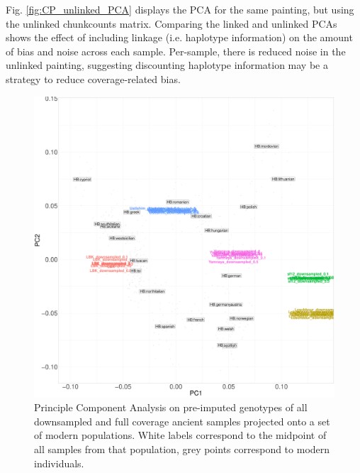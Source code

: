Fig. \ref{fig:CP_unlinked_PCA} displays the PCA for the same painting, but using the unlinked chunkcounts matrix. Comparing the linked and unlinked PCAs shows the effect of including linkage (i.e. haplotype information) on the amount of bias and noise across each sample. Per-sample, there is reduced noise in the unlinked painting, suggesting discounting haplotype information may be a strategy to reduce coverage-related bias.

\begin{figure}[htp]
    \centering
    \includegraphics[width=1.0\textwidth]{../images/chapter1/pre_GLIMPSE_PCA.pdf}
    \caption{Principle Component Analysis on pre-imputed genotypes of all downsampled and full coverage ancient samples projected onto a set of modern populations. White labels correspond to the midpoint of all samples from that population, grey points correspond to modern individuals.}
    \label{fig:pre_GLIMPSE_PCA}
\end{figure}

